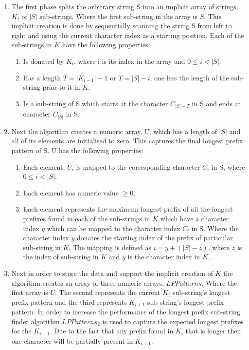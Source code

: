 \documentclass[12pt]{article}
\begin{document}
\begin{flushleft}
		\begin{enumerate}	
		\item The first phase splits the arbitrary string S into an implicit array of strings, $K$, of $|S|$ sub-strings. Where the first sub-string in the array is $S$. This implicit creation is done by sequentially scanning the string S from left to right and using the current character index as a starting position.    
		Each of the sub-strings in $K$ have the following properties:
			\begin{enumerate}
				\item Is donated by $K_{i}$, where i is its index in the array and $ 0 \le i < |S|$.
				\item Has a length $T = |K_{i-1}| - 1$ or $T = |S| - i$, one less the length of the sub-string prior to it in $K$.
				\item Is a sub-string of S which starts at the character $C_{|S| - T} $ in S and ends at character $C_{|S|}$ in S.
			\end{enumerate}		
		
		\item Next the algorithm creates a numeric array, $U$, which has a length of $|S|$ and all of its elements are initialised to zero. This captures the final longest prefix pattern of S.  
		U has the following properties:
			\begin{enumerate}
				\item Each element, $U_{i}$ is mapped to the corresponding character $C_{i}$ in S, where $ 0 \le i < |S|$.
				\item Each element has numeric value $\ge 0$.
				\item Each element represents the maximum longest prefix of all the longest prefixes found in each of the sub-strings in $K$ which have a character index $y$ which can be mapped to the character index $C_{i}$ in S. Where the character index $y$ donates the starting index of the prefix of particular sub-string in $K$. The mapping is defined as $i = y + (|S| - z)$, where $z$ is the index of sub-string in $K$ and $y$ is the character index in $K_{z}$. 
			\end{enumerate}
		
		\item Next in order to store the data and support the implicit creation of $K$ the algorithm creates an array of three numeric arrays, $LPPatterns$. Where the first array is $U$. The second represents the current $K_{i}$ sub-string's longest prefix pattern and the third represents $K_{i + 1}$ sub-string's longest prefix pattern. In order to increase the performance of the longest prefix sub-string finder algorithm $LPPatterns_{2}$ is used to capture the expected longest prefixes for the $K_{i + 1}$. Due to the fact that any prefix found in $K_{i}$ that is longer then one character will be partially present in $K_{i + 1}$.
		

\end{enumerate}
\end{flushleft}
\end{document}
